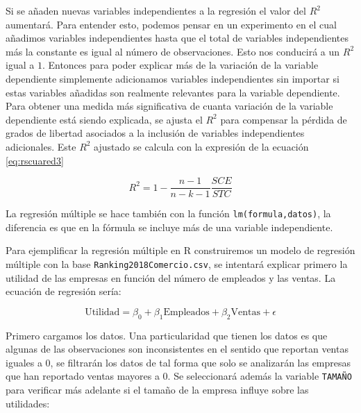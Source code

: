 \documentclass[letterpaper,]{book}
\newenvironment{Shaded}{\begin{snugshade}}{\end{snugshade}}
\newcommand{\DataTypeTok}[1]{\textcolor[rgb]{0.13,0.29,0.53}{#1}}
\newcommand{\DecValTok}[1]{\textcolor[rgb]{0.00,0.00,0.81}{#1}}
\newcommand{\KeywordTok}[1]{\textcolor[rgb]{0.13,0.29,0.53}{\textbf{#1}}}
\newcommand{\NormalTok}[1]{#1}
\newcommand{\OperatorTok}[1]{\textcolor[rgb]{0.81,0.36,0.00}{\textbf{#1}}}
\newcommand{\OtherTok}[1]{\textcolor[rgb]{0.56,0.35,0.01}{#1}}
\newcommand{\StringTok}[1]{\textcolor[rgb]{0.31,0.60,0.02}{#1}}
\begin{document}
Si se añaden nuevas variables independientes a la regresión el valor del \(R^2\) aumentará. Para entender esto, podemos pensar en un experimento en el cual añadimos variables independientes hasta que el total de variables independientes más la constante es igual al número de observaciones. Esto nos conducirá a un \(R^2\) igual a \(1\). Entonces para poder explicar más de la variación de la variable dependiente simplemente adicionamos variables independientes sin importar si estas variables añadidas son realmente relevantes para la variable dependiente. Para obtener una medida más significativa de cuanta variación de la variable dependiente está siendo explicada, se ajusta el \(R^2\) para compensar la pérdida de grados de libertad asociados a la inclusión de variables independientes adicionales. Este \(R^2\) ajustado se calcula con la expresión de la ecuación \eqref{eq:rscuared3}

\begin{equation}
R^2 = 1 -\dfrac{n-1}{n-k-1} \dfrac{SCE}{STC}
    \label{eq:rscuared3}
\end{equation}

La regresión múltiple se hace también con la función \texttt{lm(formula,datos)}, la diferencia es que en la fórmula se incluye más de una variable independiente.

Para ejemplificar la regresión múltiple en R construiremos un modelo de regresión múltiple con la base \texttt{Ranking2018Comercio.csv}, se intentará explicar primero la utilidad de las empresas en función del número de empleados y las ventas. La ecuación de regresión sería:

\begin{equation}
  \text{Utilidad} = \beta_0 + \beta_1 \text{Empleados} + \beta_2 \text{Ventas} + \epsilon
    \label{eq:modelo2}
\end{equation}

Primero cargamos los datos. Una particularidad que tienen los datos es que algunas de las observaciones son inconsistentes en el sentido que reportan ventas iguales a 0, se filtrarán los datos de tal forma que solo se analizarán las empresas que han reportado ventas mayores a 0. Se seleccionará además la variable \texttt{TAMAÑO} para verificar más adelante si el tamaño de la empresa influye sobre las utilidades:

\begin{Shaded}
\end{Shaded}
\end{document}
